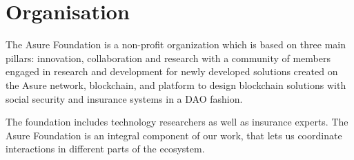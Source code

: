 \section{Organisation}
The Asure Foundation is a non-profit organization which is based on three main pillars: innovation, collaboration and research with a community of members engaged in research and development for newly developed solutions created on the Asure network, blockchain, and platform to design blockchain solutions with social security and insurance systems in a DAO fashion.
\newline

The foundation includes technology researchers as well as insurance experts. The Asure Foundation is an integral component of our work, that lets us coordinate interactions in different parts of the ecosystem.